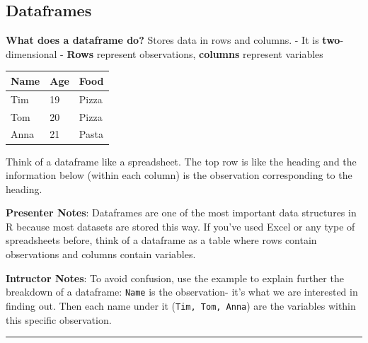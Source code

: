 \documentclass[
  letterpaper,
  DIV=11,
  numbers=noendperiod]{scrartcl}
\newcounter{none} %
\begin{document}
\subsection{Dataframes}\label{dataframes}

\textbf{What does a dataframe do?} Stores data in rows and columns. - It
is \textbf{two}-dimensional - \textbf{Rows} represent observations,
\textbf{columns} represent variables

{\def\LTcaptype{none} %
\begin{longtable}[]{@{}lll@{}}
\toprule\noalign{}
Name & Age & Food \\
\midrule\noalign{}
\endhead
\bottomrule\noalign{}
\endlastfoot
Tim & 19 & Pizza \\
Tom & 20 & Pizza \\
Anna & 21 & Pasta \\
\end{longtable}
}

\begin{tcolorbox}[enhanced jigsaw, arc=.35mm, bottomrule=.15mm, bottomtitle=1mm, breakable, colback=white, colbacktitle=quarto-callout-note-color!10!white, colframe=quarto-callout-note-color-frame, coltitle=black, left=2mm, leftrule=.75mm, opacityback=0, opacitybacktitle=0.6, rightrule=.15mm, title=\textcolor{quarto-callout-note-color}{\faInfo}\hspace{0.5em}{Look familiar?}, titlerule=0mm, toprule=.15mm, toptitle=1mm]

Think of a dataframe like a spreadsheet. The top row is like the heading
and the information below (within each column) is the observation
corresponding to the heading.

\end{tcolorbox}

\textbf{Presenter Notes}: Dataframes are one of the most important data
structures in R because most datasets are stored this way. If you've
used Excel or any type of spreadsheets before, think of a dataframe as a
table where rows contain observations and columns contain variables.

\textbf{Intructor Notes}: To avoid confusion, use the example to explain
further the breakdown of a dataframe: \texttt{Name} is the observation-
it's what we are interested in finding out. Then each name under it
(\texttt{Tim,\ Tom,\ Anna}) are the variables within this specific
observation.

\begin{center}\rule{0.5\linewidth}{0.5pt}\end{center}
\end{document}
